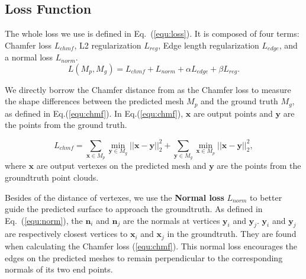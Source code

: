 \subsection{Loss Function}

The whole loss we use is defined in Eq.~(\ref{equ:loss}).
It is composed of four terms: Chamfer loss $L_{chmf}$, L2 regularization $L_{reg}$, Edge length regularization $L_{edge}$, and a normal loss $L_{norm}$.
\begin{equation}
\label{equ:loss}
L(M_p, M_g ) = L_{chmf} + L_{norm} +\alpha L_{edge}+ \beta L_{reg}.
\end{equation}

We directly borrow the Chamfer distance from \cite{PSGN} as the Chamfer loss to measure the shape differences between the predicted mesh $M_p$ and the ground truth  $M_g$, as defined in Eq.(\ref{equ:chmf}).
%
In Eq.(\ref{equ:chmf}), $\mathbf{x}$ are output points and $\mathbf{y}$ are the points from the ground truth.

\begin{equation}
\label{equ:chmf}
L_{chmf} = \sum_{\mathbf{x}\in M_p} \min_{\mathbf{y} \in M_g}||\mathbf{x}-\mathbf{y}||_2^2 + 
\sum_{\mathbf{y} \in M_g} \min_{\mathbf{x}\in M_p}||\mathbf{x}-\mathbf{y}||_2^2,
\end{equation}
where $\mathbf{x}$ are output vertexes on the predicted mesh and $\mathbf{y}$ are the points from the groundtruth point clouds.


Besides of the distance of vertexes, we use the {\textbf{Normal loss}} $L_{norm}$ to better guide the predicted surface to approach the groundtruth.
As defined in Eq.~(\ref{equ:norm}), the $\mathbf{n}_{i}$ and $\mathbf{n}_{j}$ are the normals at vertices $\mathbf{y}_i$ and $\mathbf{y}_j$. 
$\mathbf{y}_i$ and $\mathbf{y}_j$ are respectively closest vertices to $\mathbf{x}_i$ and $\mathbf{x}_j$ in the groundtruth. 
They are found when calculating the Chamfer loss (\ref{equ:chmf}). 
This normal loss encourages the edges on the predicted meshes to remain perpendicular to the corresponding normals of its two end points.

